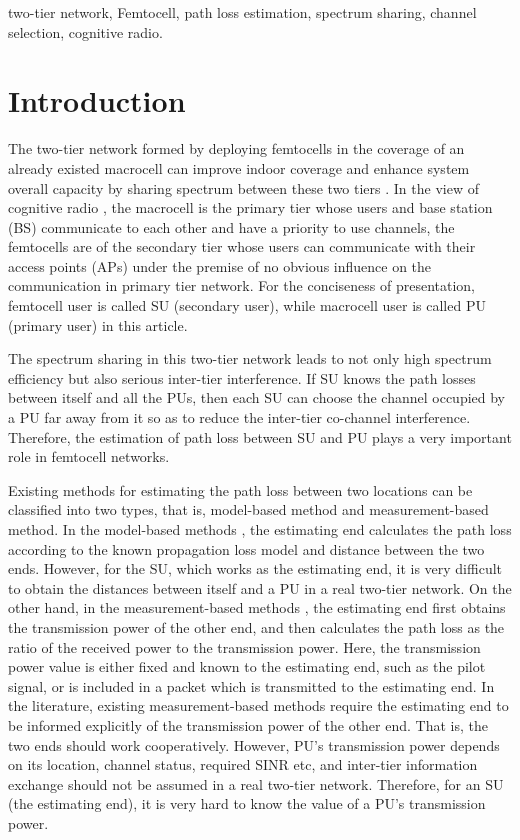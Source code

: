 \documentclass[conference]{IEEEtran}
\begin{document}
\begin{keywords}
two-tier network, Femtocell, path loss estimation, spectrum sharing,
channel selection, cognitive radio.
\end{keywords}




\IEEEpeerreviewmaketitle



\section{Introduction}
The two-tier network formed by deploying femtocells in the coverage
of an already existed macrocell can improve indoor coverage and
enhance system overall capacity by sharing spectrum between these
two tiers \cite{c1}. In the view of cognitive radio \cite{Haykin05},
the macrocell is the primary tier whose users and base station (BS)
communicate to each other and have a priority to use channels, the
femtocells are of the secondary tier whose users can communicate
with their access points (APs) under the premise of no obvious
influence on the communication in primary tier network. For the
conciseness of presentation, femtocell user is called SU (secondary
user), while macrocell user is called PU (primary user) in this
article.

The spectrum sharing in this two-tier network leads to not only high
spectrum efficiency but also serious inter-tier interference. If SU
knows the path losses between itself and all the PUs, then each SU
can choose the channel occupied by a PU far away from it so as to
reduce the inter-tier co-channel interference. Therefore, the
estimation of path loss between SU and PU plays a very important
role in femtocell networks.

Existing methods for estimating the path loss between two locations
can be classified into two types, that is, model-based method and
measurement-based method. In the model-based methods \cite{c3}, the
estimating end calculates the path loss according to the known
propagation loss model and distance between the two ends. However,
for the SU, which works as the estimating end, it is very difficult
to obtain the distances between itself and a PU in a real two-tier
network. On the other hand, in the measurement-based methods
\cite{c4,c5,c6}, the estimating end first obtains the transmission
power of the other end, and then calculates the path loss as the
ratio of the received power to the transmission power. Here, the
transmission power value is either fixed and known to the estimating
end, such as the pilot signal, or is included in a packet which is
transmitted to the estimating end. In the literature, existing
measurement-based methods require the estimating end to be informed
explicitly of the transmission power of the other end. That is, the
two ends should work cooperatively. However, PU's transmission power
depends on its location, channel status, required SINR etc, and
inter-tier information exchange should not be assumed in a real
two-tier network. Therefore, for an SU (the estimating end), it is
very hard to know the value of a PU's transmission power.
\end{document}
